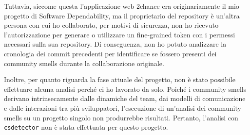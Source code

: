 Tuttavia, siccome questa l'applicazione web 2chance era originariamente il mio progetto di Software Dependability, ma il proprietario del repository è un'altra persona con cui ho collaborato, per motivi di sicurezza, non ho ricevuto l'autorizzazione per generare o utilizzare un fine-grained token con i permessi necessari sulla sua repository. Di conseguenza, non ho potuto analizzare la cronologia dei commit precedenti per identificare se fossero presenti dei community smells durante la collaborazione originale.

Inoltre, per quanto riguarda la fase attuale del progetto, non è stato possibile effettuare alcuna analisi perché ci ho lavorato da solo. Poiché i community smells derivano intrinsecamente dalle dinamiche del team, dai modelli di comunicazione e dalle interazioni tra più sviluppatori, l'esecuzione di un'analisi dei community smells su un progetto singolo non produrrebbe risultati. Pertanto, l'analisi con \texttt{csdetector} non è stata effettuata per questo progetto.
